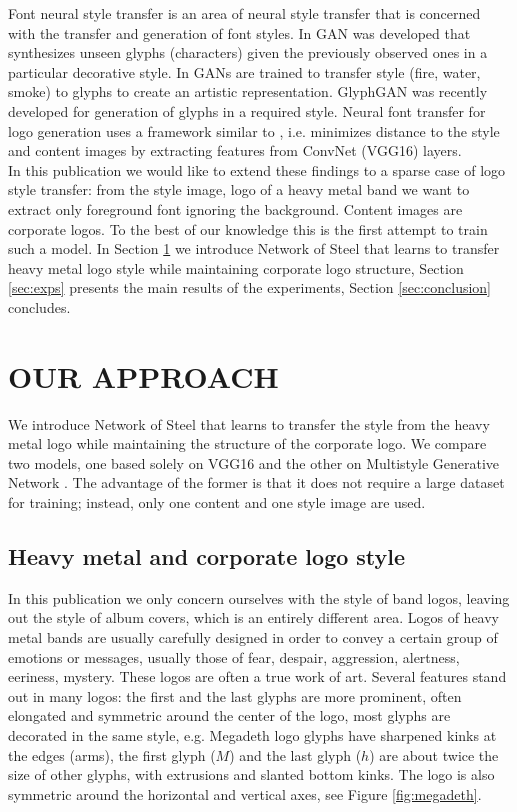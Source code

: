 \documentclass[a4paper,twoside]{article}
\begin{document}
\noindent Font neural style transfer is an area of neural style transfer that is concerned with the transfer and generation of font styles. In \cite{azadi2018multi} GAN was developed that synthesizes unseen glyphs (characters) given the previously observed ones in a particular decorative style. In \cite{yang2019controllable} GANs are trained to transfer style (fire, water, smoke) to glyphs to create an artistic representation. GlyphGAN \cite{hayashi2019glyphgan} was recently developed for generation of glyphs in a required style. Neural font transfer for logo generation \cite{atarsaikhan2018contained} uses a framework similar to \cite{gatys2016image}, i.e. minimizes distance to the style and content images by extracting features from ConvNet (VGG16) layers.\\

\noindent In this publication we would like to extend these findings to a sparse case of logo style transfer: from the style image, logo of a heavy metal band we want to extract only foreground font ignoring the background. Content images are corporate logos. To the best of our knowledge this is the first attempt to train such a model. In Section \ref{sec:model} we introduce Network of Steel that learns to transfer heavy metal logo style while maintaining corporate logo structure, Section \ref{sec:exps} presents the main results of the experiments, Section \ref{sec:conclusion} concludes.   

\section{\uppercase{Our Approach}}
\label{sec:model}
\noindent We introduce Network of Steel that learns to transfer the style from the heavy metal logo while maintaining the structure of the corporate logo. We compare two models, one based solely on VGG16 \cite{gatys2016image} and the other on Multistyle Generative Network \cite{zhang2017multi}. The advantage of the former is that it does not require a large dataset for training; instead, only one content and one style image are used. 
\subsection{Heavy metal and corporate logo style}
\noindent In this publication we only concern ourselves with the style of band logos, leaving out the style of album covers, which is an entirely different area. Logos of heavy metal bands are usually carefully designed in order to convey a certain group of emotions or messages, usually those of fear, despair, aggression, alertness, eeriness, mystery. These logos are often a true work of art. Several features stand out in many logos: the first and the last glyphs are more prominent, often elongated and symmetric around the center of the logo, most glyphs are decorated in the same style, e.g. Megadeth logo glyphs have sharpened kinks at the edges (arms), the first glyph ($M$) and the last glyph ($h$) are about twice the size of other glyphs, with extrusions and slanted bottom kinks. The logo is also symmetric around the horizontal and vertical axes, see Figure \ref{fig:megadeth}. \\
\end{document}
